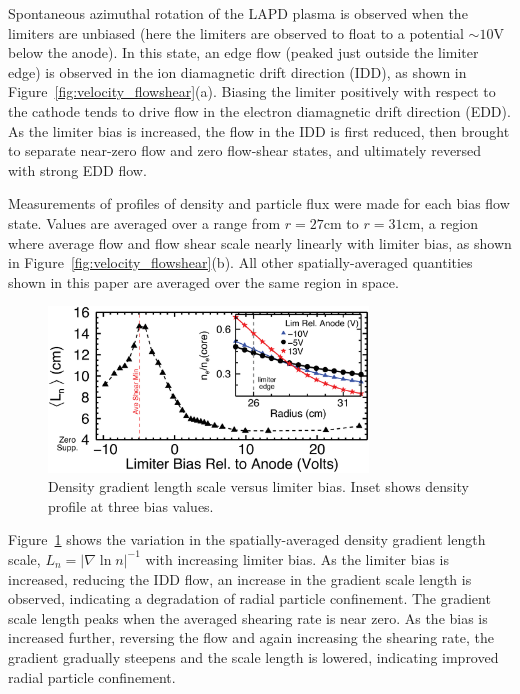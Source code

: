 \documentclass[aip,pop,amsmath,amssymb,preprint,superscriptaddress]{revtex4-1} %
\begin{document}
Spontaneous azimuthal rotation of the LAPD plasma is observed when the limiters are
unbiased (here the limiters are observed to float to a
potential $\sim 10$V below the anode).  In this state, an edge flow
(peaked just outside the limiter edge) is
observed in the ion diamagnetic drift direction (IDD), as shown in
Figure~\ref{fig:velocity_flowshear}(a).  Biasing the limiter positively
with respect to the cathode tends to drive flow in the electron
diamagnetic drift direction (EDD).  As the limiter bias is increased, the
flow in the IDD is first reduced, then brought to separate near-zero flow
and zero flow-shear states, and ultimately reversed with strong EDD flow.

Measurements of profiles of density and particle flux
were made for each bias flow state. Values are averaged over a range
from $r=27$cm to $r=31$cm, a region where average flow and flow shear scale
nearly linearly with limiter bias, as shown in
Figure~\ref{fig:velocity_flowshear}(b).  All other spatially-averaged
quantities shown in this paper are averaged over the same region in space.

\begin{figure}[!htbp]
\centerline{
\includegraphics[width=8.5cm]{figure2.eps}}
\caption{\label{fig:densgrad} Density gradient length scale versus limiter bias. Inset shows density profile at three bias values.}
\end{figure}

Figure~\ref{fig:densgrad} shows the variation in the spatially-averaged density gradient length scale, $L_{n} = \lvert \nabla \ln n \rvert ^{-1}$ with
increasing limiter bias.  As the limiter bias is increased, reducing
the IDD flow, an increase in the gradient scale length is observed,
indicating a degradation of radial particle confinement. The gradient scale length peaks
when the averaged shearing rate is near zero. As the bias is
increased further, reversing the flow and again increasing the
shearing rate, the gradient gradually steepens and the
scale length is lowered, indicating improved radial particle confinement.  
\end{document}
